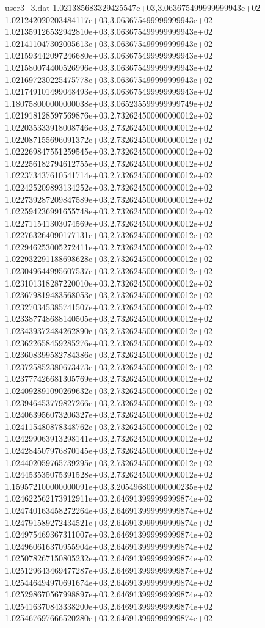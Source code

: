 \begin{filecontents}{user3_3.dat}
1.021385683329425547e+03,3.063675499999999943e+02
1.021242020203484117e+03,3.063675499999999943e+02
1.021359126532942810e+03,3.063675499999999943e+02
1.021411047302005613e+03,3.063675499999999943e+02
1.021593442097246680e+03,3.063675499999999943e+02
1.021580074400526996e+03,3.063675499999999943e+02
1.021697230225475778e+03,3.063675499999999943e+02
1.021749101499048493e+03,3.063675499999999943e+02
1.180758000000000038e+03,3.065235599999999749e+02
1.021918128597569876e+03,2.732624500000000012e+02
1.022035333918008746e+03,2.732624500000000012e+02
1.022087155696091372e+03,2.732624500000000012e+02
1.022269847551259545e+03,2.732624500000000012e+02
1.022256182794612755e+03,2.732624500000000012e+02
1.022373437610541714e+03,2.732624500000000012e+02
1.022425209893134252e+03,2.732624500000000012e+02
1.022739287209847589e+03,2.732624500000000012e+02
1.022594236991655748e+03,2.732624500000000012e+02
1.022711541303074569e+03,2.732624500000000012e+02
1.022763264090177131e+03,2.732624500000000012e+02
1.022946253005272411e+03,2.732624500000000012e+02
1.022932291188698628e+03,2.732624500000000012e+02
1.023049644995607537e+03,2.732624500000000012e+02
1.023101318287220010e+03,2.732624500000000012e+02
1.023679819483568053e+03,2.732624500000000012e+02
1.023270345385741507e+03,2.732624500000000012e+02
1.023387748688140505e+03,2.732624500000000012e+02
1.023439372484262890e+03,2.732624500000000012e+02
1.023622658459285276e+03,2.732624500000000012e+02
1.023608399582784386e+03,2.732624500000000012e+02
1.023725852380673473e+03,2.732624500000000012e+02
1.023777426681305769e+03,2.732624500000000012e+02
1.024092891090269632e+03,2.732624500000000012e+02
1.023946453779827266e+03,2.732624500000000012e+02
1.024063956073206327e+03,2.732624500000000012e+02
1.024115480878348762e+03,2.732624500000000012e+02
1.024299063913298141e+03,2.732624500000000012e+02
1.024284507976870145e+03,2.732624500000000012e+02
1.024402059765739295e+03,2.732624500000000012e+02
1.024453535075391528e+03,2.732624500000000012e+02
1.159572100000000091e+03,3.205496800000000235e+02
1.024622562173912911e+03,2.646913999999999874e+02
1.024740163458272264e+03,2.646913999999999874e+02
1.024791589272434521e+03,2.646913999999999874e+02
1.024975469367311007e+03,2.646913999999999874e+02
1.024960616370955904e+03,2.646913999999999874e+02
1.025078267150805232e+03,2.646913999999999874e+02
1.025129643469477287e+03,2.646913999999999874e+02
1.025446494970691674e+03,2.646913999999999874e+02
1.025298670567998897e+03,2.646913999999999874e+02
1.025416370843338200e+03,2.646913999999999874e+02
1.025467697666520280e+03,2.646913999999999874e+02

\end{filecontents}
